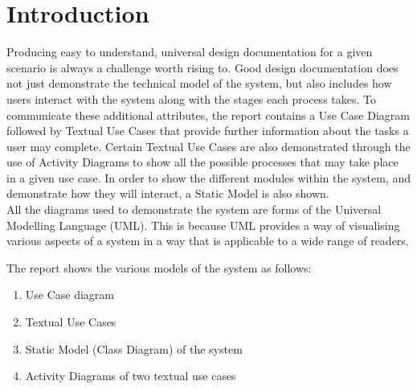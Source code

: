 \section{Introduction}
Producing easy to understand, universal design documentation for a given scenario is always a challenge worth rising to. Good design documentation does not just demonstrate the technical model of the system, but also includes how users interact with the system along with the stages each process takes. To communicate these additional attributes, the report contains a Use Case Diagram followed by Textual Use Cases that provide further information about the tasks a user may complete. Certain Textual Use Cases are also demonstrated through the use of Activity Diagrams to show all the possible processes that may take place in a given use case. In order to show the different modules within the system, and demonstrate how they will interact, a Static Model is also shown. 
\\
All the diagrams used to demonstrate the system are forms of the Universal Modelling Language (UML). This is because UML provides a way of visualising various aspects of a system in a way that is applicable to a wide range of readers. 

The report shows the various models of the system as follows:
\begin{enumerate}
	\item Use Case diagram
	\item Textual Use Cases
	\item Static Model (Class Diagram) of the system
	\item Activity Diagrams of two textual use cases
\end{enumerate}